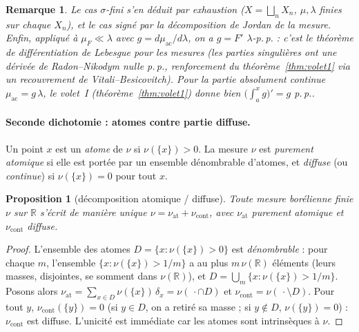 \documentclass[11pt]{article}
\theoremstyle{thmblue}
\newtheorem{proposition}[theoreme]{Proposition}
\theoremstyle{defplain}
\theoremstyle{rem}
\newtheorem{remarque}[theoreme]{Remarque}
\newcommand{\R}{\mathbb{R}}
\newcommand{\pp}{p.\,p.}
\begin{document}
\begin{remarque}
Le cas $\sigma$-fini s'en déduit par exhaustion ($X=\bigsqcup_n X_n$, $\mu,\lambda$ finies sur chaque
$X_n$), et le cas signé par la décomposition de Jordan de la mesure. Enfin, appliqué à $\mu_F\ll\lambda$
avec $g=d\mu_{\mathrm{ac}}/d\lambda$, on a $g=F'$ $\lambda$-\pp{} : c'est le théorème de différentiation
de Lebesgue pour les mesures (les parties singulières ont une dérivée de Radon--Nikodym nulle \pp,
renforcement du théorème~\ref{thm:volet1} via un recouvrement de Vitali--Besicovitch). Pour la partie
absolument continue $\mu_{\mathrm{ac}}=g\,\lambda$, le volet~I (théorème~\ref{thm:volet1}) donne bien
$\bigl(\int_a^x g\bigr)'=g$ \pp.
\end{remarque}

\paragraph{Seconde dichotomie : atomes contre partie diffuse.}
Un point $x$ est un \emph{atome} de $\nu$ si $\nu(\{x\})>0$. La mesure $\nu$ est \emph{purement
atomique} si elle est portée par un ensemble dénombrable d'atomes, et \emph{diffuse} (ou
\emph{continue}) si $\nu(\{x\})=0$ pour tout $x$.

\begin{proposition}[décomposition atomique / diffuse]\label{prop:atom}
Toute mesure borélienne finie $\nu$ sur $\R$ s'écrit de manière unique
$\nu=\nu_{\mathrm{at}}+\nu_{\mathrm{cont}}$, avec $\nu_{\mathrm{at}}$ purement atomique et
$\nu_{\mathrm{cont}}$ diffuse.
\end{proposition}

\begin{proof}
L'ensemble des atomes $D=\{x:\nu(\{x\})>0\}$ est \emph{dénombrable} : pour chaque $m$, l'ensemble
$\{x:\nu(\{x\})>1/m\}$ a au plus $m\,\nu(\R)$ éléments (leurs masses, disjointes, se somment dans
$\nu(\R)$), et $D=\bigcup_m\{x:\nu(\{x\})>1/m\}$. Posons alors
$\nu_{\mathrm{at}}=\sum_{x\in D}\nu(\{x\})\,\delta_x=\nu(\,\cdot\cap D)$ et
$\nu_{\mathrm{cont}}=\nu(\,\cdot\setminus D)$. Pour tout $y$, $\nu_{\mathrm{cont}}(\{y\})=0$ (si
$y\in D$, on a retiré sa masse ; si $y\notin D$, $\nu(\{y\})=0$) : $\nu_{\mathrm{cont}}$ est diffuse.
L'unicité est immédiate car les atomes sont intrinsèques à $\nu$.
\end{proof}
\end{document}
